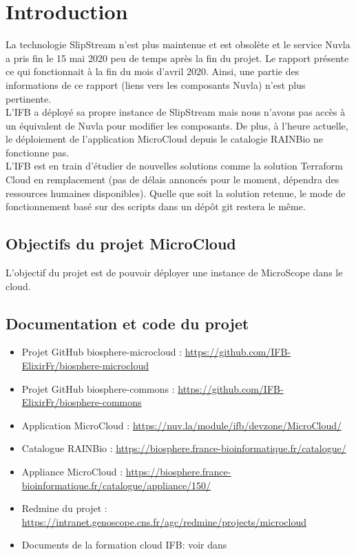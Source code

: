 \section{Introduction}

\begin{mycolorbox}
	La technologie SlipStream n'est plus maintenue et est obsolète et le service Nuvla a pris fin le 15 mai 2020 peu de temps après la fin du projet.
	Le rapport présente ce qui fonctionnait à la fin du mois d'avril 2020.
	Ainsi, une partie des informations de ce rapport (liens vers les composants Nuvla) n'est plus pertinente.\\
	L'IFB a déployé sa propre instance de SlipStream mais nous n'avons pas accès à un équivalent de Nuvla pour modifier les composants.
	De plus, à l'heure actuelle, le déploiement de l'application MicroCloud depuis le catalogie RAINBio ne fonctionne pas.\\
	L'IFB est en train d'étudier de nouvelles solutions comme la solution Terraform Cloud en remplacement (pas de délais annoncés pour le moment, dépendra des ressources humaines disponibles). Quelle que soit la solution retenue, le mode de fonctionnement basé sur des scripts dans un dépôt git restera le même.
\end{mycolorbox}

\subsection{Objectifs du projet MicroCloud}

L'objectif du projet est de pouvoir déployer une instance de MicroScope dans le cloud.

\subsection{Documentation et code du projet}

\begin{itemize}
	\item Projet GitHub biosphere-microcloud : \url{https://github.com/IFB-ElixirFr/biosphere-microcloud}
	\item Projet GitHub biosphere-commons : \url{https://github.com/IFB-ElixirFr/biosphere-commons}
	\item Application MicroCloud : \url{https://nuv.la/module/ifb/devzone/MicroCloud/}
	\item Catalogue RAINBio : \url{https://biosphere.france-bioinformatique.fr/catalogue/}
	\item Appliance MicroCloud : \url{https://biosphere.france-bioinformatique.fr/catalogue/appliance/150/}
	\item Redmine du projet : \url{https://intranet.genoscope.cns.fr/agc/redmine/projects/microcloud}
	\item Documents de la formation cloud IFB: voir dans 
\end{itemize}

